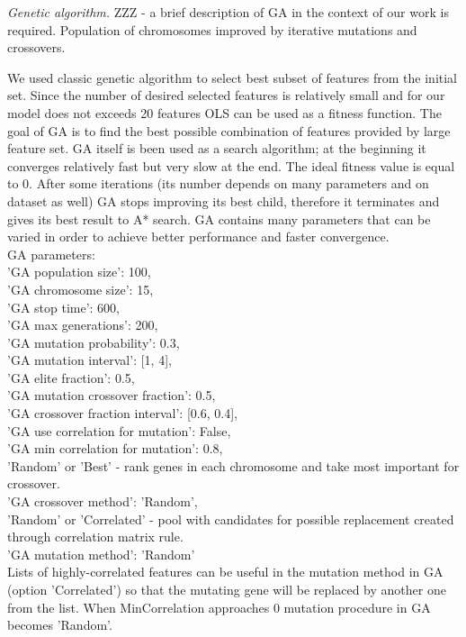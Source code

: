 \documentclass[aps,prl,reprint,amsmath,amssymb,nature]{revtex4-1}
\begin{document}
\textit{Genetic algorithm.} ZZZ - a brief description of GA in the context of our work is required. Population of chromosomes improved by iterative mutations and crossovers.

We used classic genetic algorithm to select best subset of features from the initial set. Since the number of desired selected features is relatively small and for our model does not exceeds 20 features OLS can be used as a fitness function. The goal of GA is to find the best possible combination of features provided by large feature set. GA itself is been used as a search algorithm; at the beginning it converges relatively fast but very slow at the end. The ideal fitness value is equal to 0. After some iterations (its number depends on many parameters and on dataset as well) GA stops improving its best child, therefore it terminates and gives its best result to A* search. GA contains many parameters that can be varied in order to achieve better performance and faster convergence.\\ 
GA parameters:\\
'GA population size': 100,\\
'GA chromosome size': 15,\\
'GA stop time': 600,\\
'GA max generations': 200,\\
'GA mutation probability': 0.3,\\
'GA mutation interval': [1, 4],\\
'GA elite fraction': 0.5,\\
'GA mutation crossover fraction': 0.5,\\
'GA crossover fraction interval': [0.6, 0.4],\\
'GA use correlation for mutation': False,\\
'GA min correlation for mutation': 0.8,\\
'Random' or 'Best' - rank genes in each chromosome and take most important for crossover.\\
'GA crossover method': 'Random',\\
'Random' or 'Correlated' - pool with candidates for possible replacement created through correlation matrix rule.\\
'GA mutation method': 'Random'\\
            
Lists of highly-correlated features can be useful in the mutation method in GA (option 'Correlated') so that the mutating gene will be replaced by another one from the list. When MinCorrelation approaches 0 mutation procedure in GA becomes 'Random'.
            
\end{document}
